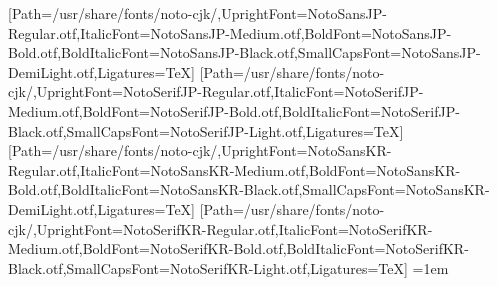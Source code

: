 \newfontfamily{}[Path=/usr/share/fonts/noto-cjk/,UprightFont=NotoSansJP-Regular.otf,ItalicFont=NotoSansJP-Medium.otf,BoldFont=NotoSansJP-Bold.otf,BoldItalicFont=NotoSansJP-Black.otf,SmallCapsFont=NotoSansJP-DemiLight.otf,Ligatures=TeX]
\newfontfamily{}[Path=/usr/share/fonts/noto-cjk/,UprightFont=NotoSerifJP-Regular.otf,ItalicFont=NotoSerifJP-Medium.otf,BoldFont=NotoSerifJP-Bold.otf,BoldItalicFont=NotoSerifJP-Black.otf,SmallCapsFont=NotoSerifJP-Light.otf,Ligatures=TeX]
\newfontfamily{}[Path=/usr/share/fonts/noto-cjk/,UprightFont=NotoSansKR-Regular.otf,ItalicFont=NotoSansKR-Medium.otf,BoldFont=NotoSansKR-Bold.otf,BoldItalicFont=NotoSansKR-Black.otf,SmallCapsFont=NotoSansKR-DemiLight.otf,Ligatures=TeX]
\newfontfamily{}[Path=/usr/share/fonts/noto-cjk/,UprightFont=NotoSerifKR-Regular.otf,ItalicFont=NotoSerifKR-Medium.otf,BoldFont=NotoSerifKR-Bold.otf,BoldItalicFont=NotoSerifKR-Black.otf,SmallCapsFont=NotoSerifKR-Light.otf,Ligatures=TeX]
\fi\fi\fi\fi\fi\fi\fi
\fi\fi
{}
\emergencystretch=1em
\setlength{\parindent}{0pt}
\everymath{\displaystyle}
\everydisplay{\displaystyle}
\captionsetup{labelformat=empty}
\renewcommand{\maketitle}{
\begin{titlepage}
\begin{center}
\vspace*{\fill}
{\huge \bfseries \thetitle\par}
\vskip 1.5em
{\Large \theauthor\par}
\vskip 1em
{\large \thedate\par}
\vspace*{\fill}
\end{center}
\end{titlepage}
}
